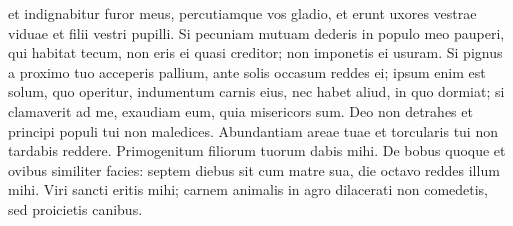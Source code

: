 \begin{biblechapter}
\verse et indignabitur furor meus, percutiamque vos gladio, et erunt uxores vestrae viduae et filii vestri pupilli. 
\verse Si pecuniam mutuam dederis in populo meo pauperi, qui habitat tecum, non eris ei quasi creditor; non imponetis ei usuram. 
\verse Si pignus a proximo tuo acceperis pallium, ante solis occasum reddes ei;  
\verse ipsum enim est solum, quo operitur, indumentum carnis eius, nec habet aliud, in quo dormiat; si clamaverit ad me, exaudiam eum, quia misericors sum. 
\verse Deo non detrahes et principi populi tui non maledices. 
\verse Abundantiam areae tuae et torcularis tui non tardabis reddere. Primogenitum filiorum tuorum dabis mihi. 
\verse De bobus quoque et ovibus similiter facies: septem diebus sit cum matre sua, die octavo reddes illum mihi. 
\verse Viri sancti eritis mihi; carnem animalis in agro dilacerati non comedetis, sed proicietis canibus. 
\end{biblechapter}

